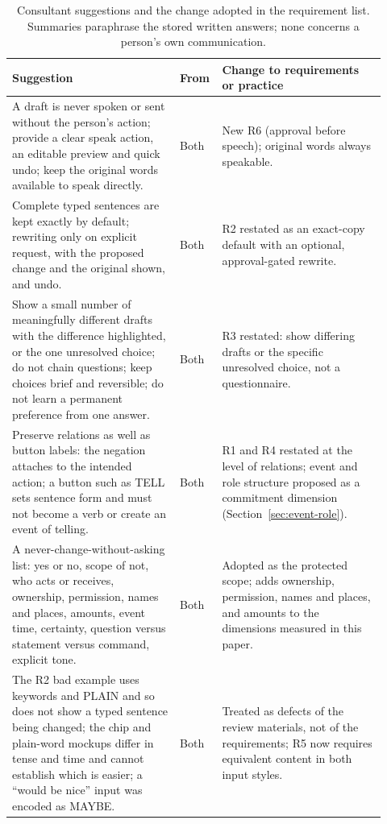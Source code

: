 \begin{table}[t]
\centering\small
\caption{Consultant suggestions and the change adopted in the requirement list. Summaries paraphrase the stored written answers; none concerns a person's own communication.}\label{tab:s4-changes}
\begin{tabular}{@{}p{0.43\linewidth}p{0.07\linewidth}p{0.42\linewidth}@{}}
\toprule
Suggestion & From & Change to requirements or practice \\
\midrule
A draft is never spoken or sent without the person's action; provide a clear speak action, an editable preview and quick undo; keep the original words available to speak directly. & Both & New R6 (approval before speech); original words always speakable. \\
Complete typed sentences are kept exactly by default; rewriting only on explicit request, with the proposed change and the original shown, and undo. & Both & R2 restated as an exact-copy default with an optional, approval-gated rewrite. \\
Show a small number of meaningfully different drafts with the difference highlighted, or the one unresolved choice; do not chain questions; keep choices brief and reversible; do not learn a permanent preference from one answer. & Both & R3 restated: show differing drafts or the specific unresolved choice, not a questionnaire. \\
Preserve relations as well as button labels: the negation attaches to the intended action; a button such as TELL sets sentence form and must not become a verb or create an event of telling. & Both & R1 and R4 restated at the level of relations; event and role structure proposed as a commitment dimension (Section~\ref{sec:event-role}). \\
A never-change-without-asking list: yes or no, scope of not, who acts or receives, ownership, permission, names and places, amounts, event time, certainty, question versus statement versus command, explicit tone. & Both & Adopted as the protected scope; adds ownership, permission, names and places, and amounts to the dimensions measured in this paper. \\
The R2 bad example uses keywords and PLAIN and so does not show a typed sentence being changed; the chip and plain-word mockups differ in tense and time and cannot establish which is easier; a ``would be nice'' input was encoded as MAYBE. & Both & Treated as defects of the review materials, not of the requirements; R5 now requires equivalent content in both input styles. \\

\end{tabular}
\end{table}
